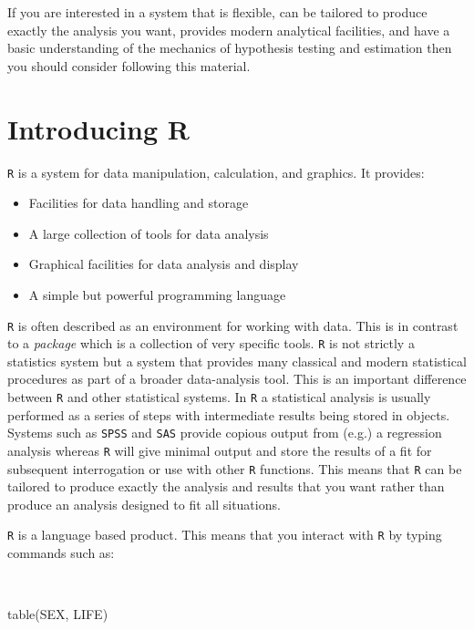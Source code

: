 \documentclass[
  12pt,
  a4paper]{book}
\newenvironment{Shaded}{\begin{snugshade}}{\end{snugshade}}
\newcommand{\FunctionTok}[1]{\textcolor[rgb]{0.00,0.00,0.00}{#1}}
\newcommand{\NormalTok}[1]{#1}
\begin{document}
If you are interested in a system that is flexible, can be tailored to produce exactly the analysis you want, provides modern analytical facilities, and have a basic understanding of the mechanics of hypothesis testing and estimation then you should consider following this material.

\hypertarget{introducing-r}{%
\chapter*{Introducing R}\label{introducing-r}}

\texttt{R} is a system for data manipulation, calculation, and graphics. It provides:

\begin{itemize}
\item
  Facilities for data handling and storage
\item
  A large collection of tools for data analysis
\item
  Graphical facilities for data analysis and display
\item
  A simple but powerful programming language
\end{itemize}

\texttt{R} is often described as an environment for working with data. This is in contrast to a \emph{package} which is a collection of very specific tools. \texttt{R} is not strictly a statistics system but a system that provides many classical and modern statistical procedures as part of a broader data-analysis tool. This is an important difference between \texttt{R} and other statistical systems. In \texttt{R} a statistical analysis is usually performed as a series of steps with intermediate results being stored in objects. Systems such as \texttt{SPSS} and \texttt{SAS} provide copious output from (e.g.) a regression analysis whereas \texttt{R} will give minimal output and store the results of a fit for subsequent interrogation or use with other \texttt{R} functions. This means that \texttt{R} can be tailored to produce exactly the analysis and results that you want rather than produce an analysis designed to fit all situations.

\texttt{R} is a language based product. This means that you interact with \texttt{R} by typing commands such as:

~

\begin{Shaded}
\begin{Highlighting}[]
\FunctionTok{table}\NormalTok{(SEX, LIFE)}
\end{Highlighting}
\end{Shaded}
\end{document}

